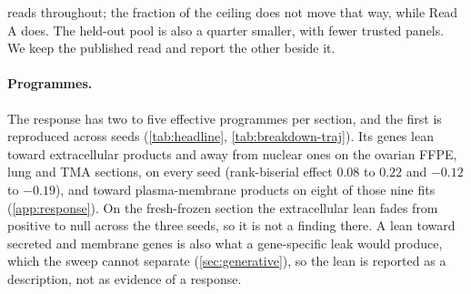 reads throughout; the fraction of the ceiling does not move that way, while Read A does. The held-out pool is also a quarter smaller, with fewer trusted panels. We keep the published read and report the other beside it.

\paragraph{Programmes.}
 The response has two to five effective programmes per section, and the first is reproduced across seeds (\cref{tab:headline}, \cref{tab:breakdown-traj}). Its genes lean toward extracellular products and away from nuclear ones on the ovarian FFPE, lung and TMA sections, on every seed (rank-biserial effect $0.08$ to $0.22$ and $-0.12$ to $-0.19$), and toward plasma-membrane products on eight of those nine fits (\cref{app:response}). On the fresh-frozen section the extracellular lean fades from positive to null across the three seeds, so it is not a finding there. A lean toward secreted and membrane genes is also what a gene-specific leak would produce, which the sweep cannot separate (\cref{sec:generative}), so the lean is reported as a description, not as evidence of a response.

